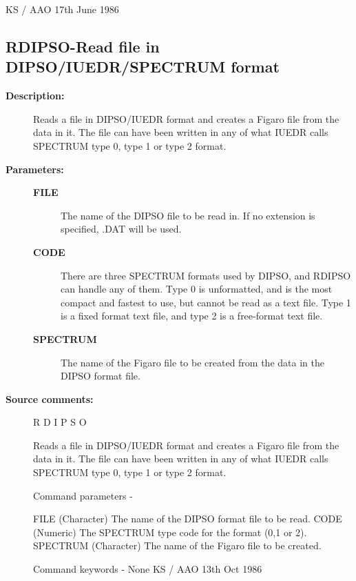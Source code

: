 \begin{description}
\begin{description}
\begin{terminalv}
                                         KS / AAO 17th June 1986
\end{terminalv}
\end{description}
\subsection{RDIPSO-\label{RDIPSO}Read file in DIPSO/IUEDR/SPECTRUM format}
\begin{description}

\item [\textbf{Description:}]
 Reads a file in DIPSO/IUEDR format and creates a Figaro file
 from the data in it.  The file can have been written in any
 of what IUEDR calls SPECTRUM type 0, type 1 or type 2 format.

\item [\textbf{Parameters:}]
\begin{description}
\item [\textbf{FILE}]
 The name of the DIPSO file to be read in.
 If no extension is specified, .DAT will be used.
\item [\textbf{CODE}]
 There are three SPECTRUM formats used by DIPSO, and
 RDIPSO can handle any of them.  Type 0 is unformatted,
 and is the most compact and fastest to use, but cannot
 be read as a text file.  Type 1 is a fixed format text
 file, and type 2 is a free-format text file.
\item [\textbf{SPECTRUM}]
 The name of the Figaro file to be created from
 the data in the DIPSO format file.
\end{description}

\item [\textbf{Source comments:}]
\begin{terminalv}
 R D I P S O

 Reads a file in DIPSO/IUEDR format and creates a Figaro file from
 the data in it.  The file can have been written in any of what IUEDR
 calls SPECTRUM type 0, type 1 or type 2 format.

 Command parameters -

 FILE      (Character) The name of the DIPSO format file to be read.
 CODE      (Numeric) The SPECTRUM type code for the format (0,1 or 2).
 SPECTRUM  (Character) The name of the Figaro file to be created.

 Command keywords -  None
                                           KS / AAO 13th Oct 1986
\end{terminalv}
\end{description}

\end{description}
